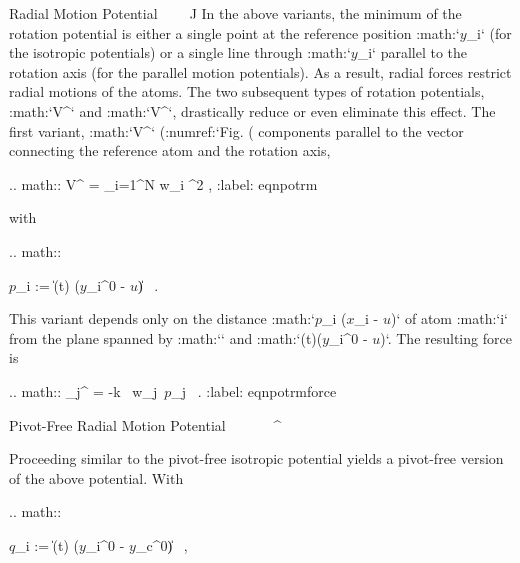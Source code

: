 Radial Motion Potential
^^^^^^^^^^^^^^^^^^^^^^^

In the above variants, the minimum of the rotation potential is either a
single point at the reference position
:math:`{\mbox{\boldmath ${y}$}}_i` (for the isotropic potentials) or a
single line through :math:`{\mbox{\boldmath ${y}$}}_i` parallel to the
rotation axis (for the parallel motion potentials). As a result, radial
forces restrict radial motions of the atoms. The two subsequent types of
rotation potentials, :math:`V^` and :math:`V^\mathrm{rm2}`, drastically
reduce or even eliminate this effect. The first variant, :math:`V^\mathrm{rm}`
(:numref:`Fig. (%
components parallel to the vector connecting the reference atom and the
rotation axis,

.. math:: V^ =  \sum_{i=1}^{N} w_i ^2 ,
          :label: eqnpotrm

with

.. math::

   {\mbox{\boldmath ${p}$}}_i := 
    {\| \times \mathbf{\Omega}(t) ({\mbox{\boldmath ${y}$}}_i^0 - {\mbox{\boldmath ${u}$}})\|} \ .

This variant depends only on the distance
:math:`{\mbox{\boldmath ${p}$}}_i \cdot ({\mbox{\boldmath ${x}$}}_i -
{\mbox{\boldmath ${u}$}})` of atom :math:`i` from the plane spanned by
:math:`\hat{{\mbox{\boldmath ${v}$}}}` and
:math:`\mathbf{\Omega}(t)({\mbox{\boldmath ${y}$}}_i^0 - {\mbox{\boldmath ${u}$}})`.
The resulting force is

.. math:: _{\!j}^ =
           -k \, w_j  \,{\mbox{\boldmath ${p}$}}_j \,  .
          :label: eqnpotrmforce

Pivot-Free Radial Motion Potential
^^^^^^^^^^^^^^^^^^^^^^^^^^^^^^^^^^

Proceeding similar to the pivot-free isotropic potential yields a
pivot-free version of the above potential. With

.. math::

   {\mbox{\boldmath ${q}$}}_i := 
    {\| \times \mathbf{\Omega}(t) ({\mbox{\boldmath ${y}$}}_i^0 - {\mbox{\boldmath ${y}$}}_c^0)\|} \, ,


